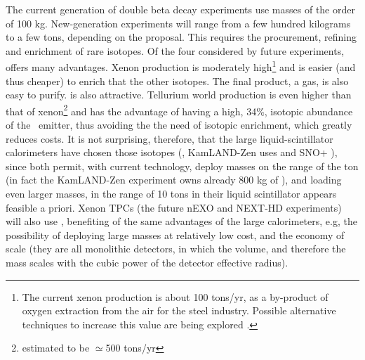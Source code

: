 The current generation of double beta decay experiments use masses of the order of 100 kg. New-generation experiments will range from a few hundred kilograms to a few tons, depending on the proposal. This requires the procurement, refining and enrichment of rare isotopes. Of the four considered by future experiments,  offers many advantages. Xenon production is moderately high\footnote{The current xenon production is about 100 tons/yr, as a by-product of oxygen extraction from the air for the steel industry. Possible alternative techniques to increase this value are being explored \cite{Avasthi:2021lgy}.} and  is easier (and thus cheaper) to enrich that the other isotopes. The final product, a gas, is also easy to purify.  is also attractive. Tellurium world production is even higher than that of xenon\footnote{estimated to be $\simeq$500 tons/yr} and has the advantage of having a high, 34\%, isotopic abundance of the \bb\ emitter, thus avoiding the   the need of isotopic enrichment, which greatly reduces costs. It is not surprising, therefore, that the large liquid-scintillator calorimeters have chosen those isotopes (, KamLAND-Zen uses  and SNO+ ), since both permit, with current technology, deploy masses on the range of the ton (in fact  the KamLAND-Zen experiment owns already 800 kg of ), and loading even larger masses, in the range of 10 tons in their liquid scintillator appears feasible a priori. Xenon TPCs (the future nEXO and NEXT-HD experiments) will also use , benefiting of the same advantages of the large calorimeters, e.g, the possibility of deploying large masses at relatively low cost, and the economy of scale (they are all monolithic detectors, in which the volume, and therefore the mass scales with the cubic power of the detector effective radius).  



